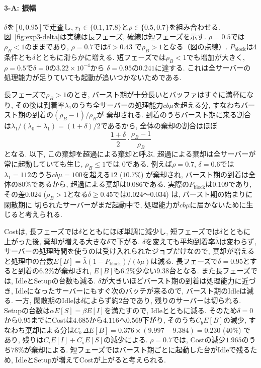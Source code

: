 \documentclass[a4paper, 11pt, dvipdfmx]{jsreport}
\begin{document}
\paragraph{3-A: 振幅}
$\delta$を$[0, 0.95]$で走査し, $r_1 \in \{0.1, 17.8\}$と$\rho \in \{0.5, 0.7\}$を組み合わせる. 図~\ref{fig:exp3-delta}は実線は長フェーズ, 破線は短フェーズを示す. $\rho = 0.5$では$\rho_B < 1$のままであり, $\rho = 0.7$では$\delta > 0.43$
で$\rho_B > 1$となる（図の点線）. $P_{\mathrm{block}}$は4条件とも$\delta$とともに滑らかに増える.
短フェーズでは$\rho_B < 1$でも増加が大きく, $\rho = 0.5$で$\delta = 0$の$3.22 \times 10^{-4}$から
$\delta = 0.95$の$0.241$に達する. これは全サーバーの
処理能力が足りていても起動が追いつかないためである.

長フェーズで$\rho_B > 1$のとき, バースト期が十分長いとバッファはすぐに満杯になり,
その後は到着率$\lambda_1$のうち全サーバーの処理能力$cb\mu$を超える分, すなわちバースト期の到着の$(\rho_B - 1)/\rho_B$が
棄却される. 到着のうちバースト期に来る割合は$\lambda_1/(\lambda_0 + \lambda_1) = (1+\delta)/2$であるから, 全体の棄却の割合はほぼ
\begin{equation}
    \frac{1+\delta}{2} \cdot \frac{\rho_B - 1}{\rho_B}
    \label{eq:excess-fraction}
\end{equation}
となる. 以下, この棄却を超過による棄却と呼ぶ. 超過による棄却は全サーバーが常に起動していても生じ, $\rho_B \le 1$では
$0$である. 例えば$\rho = 0.7$, $\delta = 0.6$では$\lambda_1 = 112$のうち$cb\mu = 100$を超える$12$ ($10.7\%$) が棄却され,
バースト期の到着は全体の$80\%$であるから, 超過による棄却は$0.086$である. 実際の$P_{\mathrm{block}}$は$0.109$であり, その差$0.024$ ($\rho_B > 1$となる$\delta \ge 0.45$では$0.024$〜$0.034$) は, バースト期の始まりに閑散期に
切られたサーバーがまだ起動中で, 処理能力が$cb\mu$に届かないために生じると考えられる.

Costは, 長フェーズでは$\delta$とともにほぼ単調に減少し,
短フェーズでは$\delta$とともに上がった後, 棄却が増える大きな$\delta$で下がる.
$\delta$を変えても平均到着率$\bar{\lambda}$は変わらず, サーバーの処理時間を使うのは受け入れられたジョブだけなので,
棄却が増えると処理中の台数$E[B] = \bar{\lambda}(1 - P_{\mathrm{block}})/(b\mu)$は減る.
長フェーズで$\delta = 0.95$とすると到着の$6.2\%$が棄却され, $E[B]$も$6.2\%$少ない$9.38$台となる.
また長フェーズでは, IdleとSetupの台数も減る. $\delta$が大きいほどバースト期の到着は処理能力に近づき, Idleになったサーバーにもすぐ次のバッチが来るので,
バースト期のIdleは減る. 一方, 閑散期のIdleは$\delta$によらず約$2$台であり, 残りのサーバーは切られる. Setupの台数は$\alpha E[S] = \beta E[I]$を満たすので, Idleとともに減る.
そのため$\delta = 0$から$0.95$までにCostは$4.685$から$4.116$へ$0.569$下がり, そのうち$C_b E[B]$の減少,
すなわち棄却による分は$C_b\, \Delta E[B] = 0.376 \times (9.997 - 9.384) = 0.230$ ($40\%$) であり, 残りは$C_i E[I] + C_s E[S]$の減少による.
$\rho = 0.7$では, Costの減少$1.965$のうち$78\%$が棄却による. 短フェーズではバースト期ごとに起動した台がIdleで残るため,
IdleとSetupが増えてCostが上がると考えられる.
\end{document}
